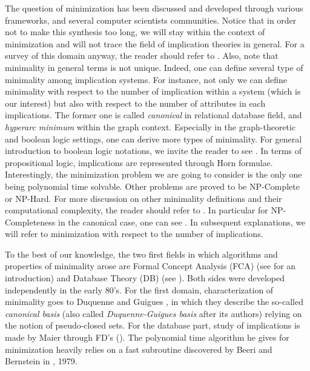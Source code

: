The question of minimization has been discussed and developed through various 
frameworks, and several computer scientists communities. Notice that in order 
not to make this synthesis too long, we will stay within the context of 
minimization and will not trace the field of implication theories in general. 
For a survey of this domain anyway, the reader should refer to 
\cite{wild_joy_2017}. Also, note that minimality in general terms is not 
unique. Indeed, one can define several type of minimality among implication 
systems. For instance, not only we can define minimality with respect to the 
number of implication within a system (which is our interest) but also with 
respect to the number of attributes in each implications. The former one is 
called \textit{canonical} in relational database field, and \textit{hyperarc 
	minimum} within the graph context. Especially in the graph-theoretic and 
boolean logic settings, one can derive more types of minimality. For general 
introduction to boolean logic notations, we invite the reader to see 
\cite{cori_mathematical_2000}. In terms of propositional logic, implications 
are represented through Horn formulae. Interestingly, the minimization problem 
we are going to consider is the only one being polynomial time solvable. Other 
problems are proved to be NP-Complete or NP-Hard. For more discussion on other 
minimality definitions and their computational complexity, the reader should 
refer to \cite{boros_strong_2017, ausiello_directed_2017, 
	b._ganter_conceptual_2016, ausiello_minimal_1986, wild_joy_2017, 
	boros_horn_1998}. In particular for NP-Completeness in the canonical case, 
	one 
can see \cite{hammer_optimal_1993}. In subsequent explanations, we will refer 
to minimization with respect to the number of implications.

\vspace{1.2em}

To the best of our knowledge, the two first fields in which algorithms and 
properties of minimality arose are Formal Concept Analysis (FCA) (see 
\cite{ganter_formal_1999, 
	ganter_two_2010} for an introduction) and Database Theory (DB) (see 
\cite{maier_theory_1983}). Both sides were developed independently in the early 
80's. For the first domain, characterization of minimality goes to Duquenne and 
Guigues \cite{guigues_j.l_familles_1986}, in which they describe the so-called 
\textit{canonical basis} (also called \textit{Duquenne-Guigues basis} after its 
authors) relying on the notion of pseudo-closed sets. For the database part, 
study of implications is made by Maier through FD's (\cite{maier_theory_1983, 
	david_minimum_1980}). The polynomial time algorithm he gives for 
	minimization 
heavily relies on a fast subroutine discovered by Beeri and Bernstein in 
\cite{beeri_computational_1979}, 1979.

